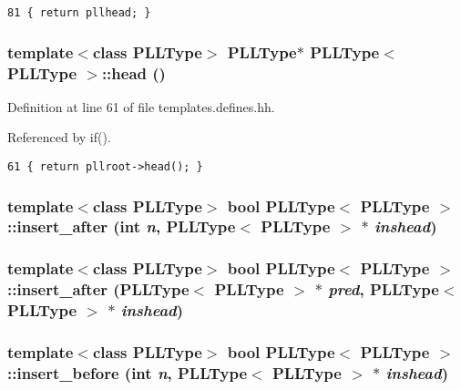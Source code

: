 \footnotesize\begin{verbatim}81 { return pllhead; } 
\end{verbatim}\normalsize 
{}
\subsubsection{\setlength{\rightskip}{0pt plus 5cm}template$<$class PLLType$>$ PLLType$\ast$ PLLType$<$ PLLType $>$::head ()\hspace{0.3cm}{\tt  [inline]}}\label{classPLLType_a3}




Definition at line 61 of file templates.defines.hh.

Referenced by if().



\footnotesize\begin{verbatim}61 { return pllroot->head(); } 
\end{verbatim}\normalsize 
{}
\subsubsection{\setlength{\rightskip}{0pt plus 5cm}template$<$class PLLType$>$ bool PLLType$<$ PLLType $>$::insert\_\-after (int {\em n}, PLLType$<$ PLLType $>$ $\ast$ {\em inshead})\hspace{0.3cm}{\tt  [inline]}}\label{classPLLType_a24}


\subsubsection{\setlength{\rightskip}{0pt plus 5cm}template$<$class PLLType$>$ bool PLLType$<$ PLLType $>$::insert\_\-after (PLLType$<$ PLLType $>$ $\ast$ {\em pred}, PLLType$<$ PLLType $>$ $\ast$ {\em inshead})\hspace{0.3cm}{\tt  [inline]}}\label{classPLLType_a23}


\subsubsection{\setlength{\rightskip}{0pt plus 5cm}template$<$class PLLType$>$ bool PLLType$<$ PLLType $>$::insert\_\-before (int {\em n}, PLLType$<$ PLLType $>$ $\ast$ {\em inshead})\hspace{0.3cm}{\tt  [inline]}}\label{classPLLType_a26}


